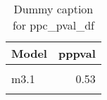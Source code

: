 \begin{table}
\centering
\caption{Dummy caption for ppc_pval_df}
\centering
\fontsize{10}{12}\selectfont
\begin{tabular}[t]{lr}
\toprule
Model & pppval\\
\midrule
\cellcolor{gray!10}{m2} & \cellcolor{gray!10}{0.53}\\
m3.1 & 0.53\\
\cellcolor{gray!10}{m4} & \cellcolor{gray!10}{0.52}\\
\bottomrule
\end{tabular}
\end{table}

